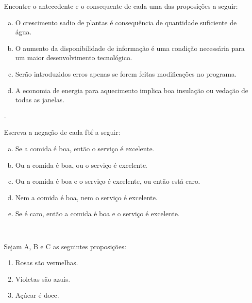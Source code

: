 \documentclass[a4paper, 12pt, addpoints]{exam}
\begin{document}
\begin{questions}
  \question  Encontre o antecedente e o consequente de cada uma das proposições a seguir:

  \begin{enumerate}[a)]
    \item O crescimento sadio de plantas é consequência de quantidade suficiente de
          água.
    \item O aumento da disponibilidade de informação é uma condição necessária para
          um maior desenvolvimento tecnológico.
    \item Serão introduzidos erros apenas se forem feitas modificações no programa.
    \item A economia de energia para aquecimento implica boa insulação ou vedação
          de todas as janelas.
  \end{enumerate}

  \begin{resp}
    -
  \end{resp}

  \question Escreva a negação de cada fbf a seguir:
  \begin{enumerate}[a)]
    \item Se a comida é boa, então o serviço é excelente.
    \item Ou a comida é boa, ou o serviço é excelente.
    \item Ou a comida é boa e o serviço é excelente, ou então está caro.
    \item Nem a comida é boa, nem o serviço é excelente.
    \item Se é caro, então a comida é boa e o serviço é excelente.
  \end{enumerate}

  \begin{resp}~
    -
  \end{resp}

  \question Sejam A, B e C as seguintes proposições:
  \begin{enumerate}[A -]
    \item Rosas são vermelhas.
    \item Violetas são azuis.
    \item Açúcar é doce.
  \end{enumerate}


\end{questions}
\end{document}
